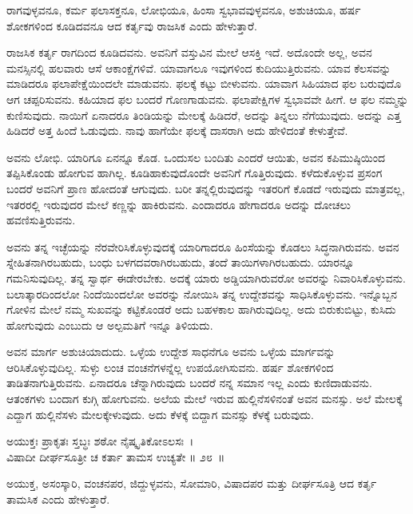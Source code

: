 \begin{artha}
ರಾಗವುಳ್ಳವನೂ, ಕರ್ಮ ಫಲಾಸಕ್ತನೂ, ಲೋಭಿಯೂ, ಹಿಂಸಾ ಸ್ವಭಾವವುಳ್ಳವನೂ, ಅಶುಚಿಯೂ, ಹರ್ಷ ಶೋಕಗಳಿಂದ ಕೂಡಿದವನೂ ಆದ ಕರ್ತೃವು ರಾಜಸಿಕ ಎಂದು ಹೇಳುತ್ತಾರೆ.
\end{artha}

ರಾಜಸಿಕ ಕರ್ತೃ ರಾಗದಿಂದ ಕೂಡಿದವನು. ಅವನಿಗೆ ವಸ್ತುವಿನ ಮೇಲೆ ಆಸಕ್ತಿ ಇದೆ. ಅದೊಂದೇ ಅಲ್ಲ, ಅವನ ಮನಸ್ಸಿನಲ್ಲಿ ಹಲವಾರು ಆಸೆ ಆಕಾಂಕ್ಷೆಗಳಿವೆ. ಯಾವಾಗಲೂ ಇವುಗಳಿಂದ ಕುದಿಯುತ್ತಿರುವನು. ಯಾವ ಕೆಲಸವನ್ನು ಮಾಡಿದರೂ ಫಲಾಪೇಕ್ಷೆಯಿಂದಲೇ ಮಾಡುವನು. ಫಲಕ್ಕೆ ಕಟ್ಟು ಬೀಳುವನು. ಯಾವಾಗ ಸಿಹಿಯಾದ ಫಲ ಬರುವುದೊ ಆಗ ಚಪ್ಪರಿಸುವನು. ಕಹಿಯಾದ ಫಲ ಬಂದರೆ ಗೊಣಗಾಡುವನು. ಫಲಾಪೇಕ್ಷಿಗಳ ಸ್ವಭಾವವೇ ಹೀಗೆ. ಆ ಫಲ ನಮ್ಮನ್ನು ಕುಣಿಸುವುದು. ನಾಯಿಗೆ ಏನಾದರೂ ತಿಂಡಿಯನ್ನು ಮೇಲಕ್ಕೆ ಹಿಡಿದರೆ, ಅದನ್ನು ತಿನ್ನಲು ನೆಗೆಯುವುದು. ಅದನ್ನು ಎತ್ತ ಹಿಡಿದರೆ ಅತ್ತ ಹಿಂದೆ ಓಡುವುದು. ನಾವು ಹಾಗೆಯೇ ಫಲಕ್ಕೆ ದಾಸರಾಗಿ ಅದು ಹೇಳಿದಂತೆ ಕೇಳುತ್ತೇವೆ.

ಅವನು ಲೋಭಿ. ಯಾರಿಗೂ ಏನನ್ನೂ ಕೊಡ. ಒಂದುಸಲ ಬಂದಿತು ಎಂದರೆ ಆಯಿತು, ಅವನ ಕಪಿಮುಷ್ಠಿಯಿಂದ ತಪ್ಪಿಸಿಕೊಂಡು ಹೋಗುವ ಹಾಗಿಲ್ಲ. ಕೂಡಿಹಾಕುವುದೊಂದೇ ಅವನಿಗೆ ಗೊತ್ತಿರುವುದು. ಕಳೆದುಕೊಳ್ಳುವ ಪ್ರಸಂಗ ಬಂದರೆ ಅವನಿಗೆ ಪ್ರಾಣ ಹೋದಂತೆ ಆಗುವುದು. ಬರೀ ತನ್ನಲ್ಲಿರುವುದನ್ನು ಇತರರಿಗೆ ಕೊಡದೆ ಇರುವುದು ಮಾತ್ರವಲ್ಲ, ಇತರರಲ್ಲಿ ಇರುವುದರ ಮೇಲೆ ಕಣ್ಣನ್ನು ಹಾಕಿರುವನು. ಎಂದಾದರೂ ಹೇಗಾದರೂ ಅದನ್ನು ದೋಚಲು ಹವಣಿಸುತ್ತಿರುವನು.

ಅವನು ತನ್ನ ಇಚ್ಛೆಯನ್ನು ನೆರವೇರಿಸಿಕೊಳ್ಳುವುದಕ್ಕೆ ಯಾರಿಗಾದರೂ ಹಿಂಸೆಯನ್ನು ಕೊಡಲು ಸಿದ್ಧನಾಗಿರುವನು. ಅವನ ಸ್ನೇಹಿತನಾಗಿರಬಹುದು, ಬಂಧು ಬಳಗದವರಾಗಿರಬಹುದು, ತಂದೆ ತಾಯಿಗಳಾಗಿರಬಹುದು. ಯಾರನ್ನೂ ಗಮನಿಸುವುದಿಲ್ಲ. ತನ್ನ ಸ್ವಾರ್ಥ ಈಡೇರಬೇಕು. ಅದಕ್ಕೆ ಯಾರು ಅಡ್ಡಿಯಾಗಿರುವರೋ ಅವರನ್ನು ನಿವಾರಿಸಿಕೊಳ್ಳುವನು. ಬಲಾತ್ಕಾರದಿಂದಲೋ ನಿಂದೆಯಿಂದಲೋ ಅವರನ್ನು ನೋಯಿಸಿ ತನ್ನ ಉದ್ದೇಶವನ್ನು ಸಾಧಿಸಿಕೊಳ್ಳುವನು. ಇನ್ನೊಬ್ಬನ ಗೋಳಿನ ಮೇಲೆ ನಮ್ಮ ಸುಖವನ್ನು ಕಟ್ಟಿಕೊಂಡರೆ ಅದು ಬಹಳಕಾಲ ಹಾಗಿರುವುದಿಲ್ಲ. ಅದು ಬಿರುಕುಬಿಟ್ಟು, ಕುಸಿದು ಹೋಗುವುದು ಎಂಬುದು ಆ ಅಲ್ಪಮತಿಗೆ ಇನ್ನೂ ತಿಳಿಯದು.

ಅವನ ಮಾರ್ಗ ಅಶುಚಿಯಾದುದು. ಒಳ್ಳೆಯ ಉದ್ದೇಶ ಸಾಧನೆಗೂ ಅವನು ಒಳ್ಳೆಯ ಮಾರ್ಗವನ್ನು ಆರಿಸಿಕೊಳ್ಳುವುದಿಲ್ಲ. ಸುಳ್ಳು ಲಂಚ ವಂಚನೆಗಳನ್ನೆಲ್ಲ ಉಪಯೋಗಿಸುವನು. ಹರ್ಷ ಶೋಕಗಳಿಂದ ತಾಡಿತನಾಗುತ್ತಿರುವನು. ಏನಾದರೂ ಚೆನ್ನಾಗಿರುವುದು ಬಂದರೆ ನನ್ನ ಸಮಾನ ಇಲ್ಲ ಎಂದು ಕುಣಿದಾಡುವನು. ಆತಂಕಗಳು ಬಂದಾಗ ಕುಗ್ಗಿ ಹೋಗುವನು. ಅಲೆಯ ಮೇಲೆ ಇರುವ ಹುಲ್ಲಿನೆಸಳಿನಂತೆ ಅವನ ಮನಸ್ಸು. ಅಲೆ ಮೇಲಕ್ಕೆ ಎದ್ದಾಗ ಹುಲ್ಲಿನೆಸಳು ಮೇಲಕ್ಕೇಳುವುದು. ಅದು ಕೆಳಕ್ಕೆ ಬಿದ್ದಾಗ ಮನಸ್ಸು ಕೆಳಕ್ಕೆ ಬರುವುದು.

\begin{shloka}
ಅಯುಕ್ತಃ ಪ್ರಾಕೃತಃ ಸ್ತಬ್ಧಃ ಶಠೋ ನೈಷ್ಕೃತಿಕೋಽಲಸಃ~।\\ವಿಷಾದೀ ದೀರ್ಘಸೂತ್ರೀ ಚ ಕರ್ತಾ ತಾಮಸ ಉಚ್ಯತೇ \hfill॥ ೨೮~॥
\end{shloka}

\begin{artha}
ಅಯುಕ್ತ, ಅಸಂಸ್ಕಾರಿ, ವಂಚನಪರ, ಜಿದ್ದುಳ್ಳವನು, ಸೋಮಾರಿ, ವಿಷಾದಪರ ಮತ್ತು ದೀರ್ಘ\-ಸೂತ್ರಿ ಆದ ಕರ್ತೃ ತಾಮಸಿಕ ಎಂದು ಹೇಳುತ್ತಾರೆ.
\end{artha}

